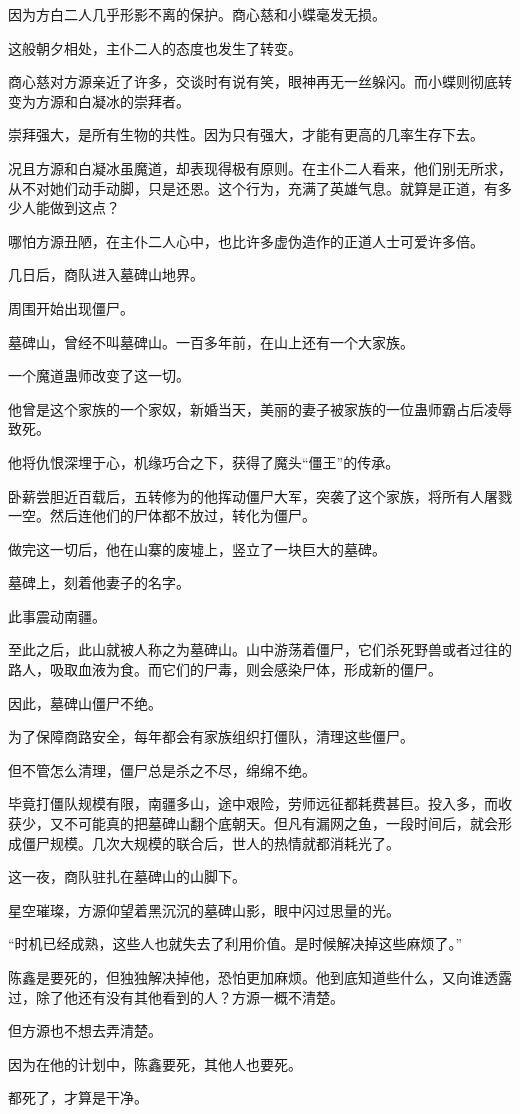 \begin{this_body}
因为方白二人几乎形影不离的保护。商心慈和小蝶毫发无损。

这般朝夕相处，主仆二人的态度也发生了转变。

商心慈对方源亲近了许多，交谈时有说有笑，眼神再无一丝躲闪。而小蝶则彻底转变为方源和白凝冰的崇拜者。

崇拜强大，是所有生物的共性。因为只有强大，才能有更高的几率生存下去。

况且方源和白凝冰虽魔道，却表现得极有原则。在主仆二人看来，他们别无所求，从不对她们动手动脚，只是还恩。这个行为，充满了英雄气息。就算是正道，有多少人能做到这点？

哪怕方源丑陋，在主仆二人心中，也比许多虚伪造作的正道人士可爱许多倍。

几日后，商队进入墓碑山地界。

周围开始出现僵尸。

墓碑山，曾经不叫墓碑山。一百多年前，在山上还有一个大家族。

一个魔道蛊师改变了这一切。

他曾是这个家族的一个家奴，新婚当天，美丽的妻子被家族的一位蛊师霸占后凌辱致死。

他将仇恨深埋于心，机缘巧合之下，获得了魔头“僵王”的传承。

卧薪尝胆近百载后，五转修为的他挥动僵尸大军，突袭了这个家族，将所有人屠戮一空。然后连他们的尸体都不放过，转化为僵尸。

做完这一切后，他在山寨的废墟上，竖立了一块巨大的墓碑。

墓碑上，刻着他妻子的名字。

此事震动南疆。

至此之后，此山就被人称之为墓碑山。山中游荡着僵尸，它们杀死野兽或者过往的路人，吸取血液为食。而它们的尸毒，则会感染尸体，形成新的僵尸。

因此，墓碑山僵尸不绝。

为了保障商路安全，每年都会有家族组织打僵队，清理这些僵尸。

但不管怎么清理，僵尸总是杀之不尽，绵绵不绝。

毕竟打僵队规模有限，南疆多山，途中艰险，劳师远征都耗费甚巨。投入多，而收获少，又不可能真的把墓碑山翻个底朝天。但凡有漏网之鱼，一段时间后，就会形成僵尸规模。几次大规模的联合后，世人的热情就都消耗光了。

这一夜，商队驻扎在墓碑山的山脚下。

星空璀璨，方源仰望着黑沉沉的墓碑山影，眼中闪过思量的光。

“时机已经成熟，这些人也就失去了利用价值。是时候解决掉这些麻烦了。”

陈鑫是要死的，但独独解决掉他，恐怕更加麻烦。他到底知道些什么，又向谁透露过，除了他还有没有其他看到的人？方源一概不清楚。

但方源也不想去弄清楚。

因为在他的计划中，陈鑫要死，其他人也要死。

都死了，才算是干净。

\end{this_body}

